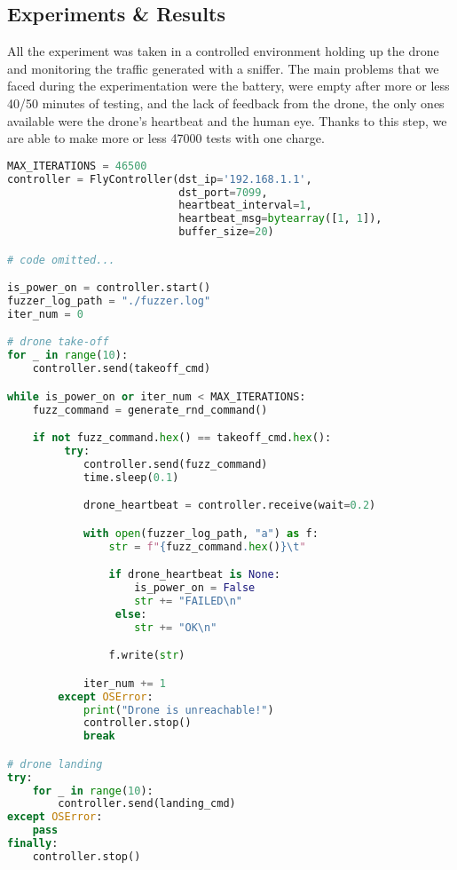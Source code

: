 \subsection*{Experiments \& Results}
All the experiment was taken in a controlled environment holding up the drone and monitoring the traffic generated with a sniffer.
The main problems that we faced during the experimentation were the battery, were empty after more or less 40/50 minutes of testing, and the lack of feedback from the drone, the only ones available were the drone's heartbeat and the human eye. Thanks to this step, we are able to make more or less 47000 tests with one charge.
  
\begin{lstlisting}[language=Python, basicstyle=\tiny, label={lst:fuzzer}, caption=Fuzzer]
MAX_ITERATIONS = 46500
controller = FlyController(dst_ip='192.168.1.1', 
                           dst_port=7099, 
                           heartbeat_interval=1, 
                           heartbeat_msg=bytearray([1, 1]), 
                           buffer_size=20)

# code omitted...

is_power_on = controller.start()
fuzzer_log_path = "./fuzzer.log"
iter_num = 0

# drone take-off
for _ in range(10):
    controller.send(takeoff_cmd)

while is_power_on or iter_num < MAX_ITERATIONS:
    fuzz_command = generate_rnd_command()

    if not fuzz_command.hex() == takeoff_cmd.hex():
         try:
            controller.send(fuzz_command)
            time.sleep(0.1)

            drone_heartbeat = controller.receive(wait=0.2)

            with open(fuzzer_log_path, "a") as f:
                str = f"{fuzz_command.hex()}\t"

                if drone_heartbeat is None:
                    is_power_on = False 
                    str += "FAILED\n"
                 else:
                    str += "OK\n"

                f.write(str)

            iter_num += 1
        except OSError:
            print("Drone is unreachable!")
            controller.stop()
            break

# drone landing
try:
    for _ in range(10):
        controller.send(landing_cmd)
except OSError:
    pass
finally:
    controller.stop()
\end{lstlisting}

